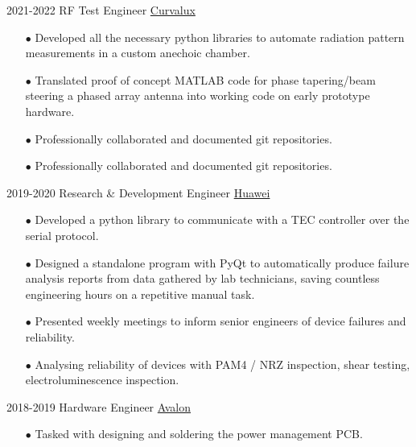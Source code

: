 \documentclass[9pt]{developercv} %
\begin{document}
\begin{entrylist}
	\entry
		{2021-2022}
		{RF Test Engineer}
		{\href{https://Curvalux.com}{Curvalux}}
		{	
			\begin{itemize}
				\item[$\bullet$\hspace*{0.5cm}] Developed all the necessary python libraries to automate radiation pattern measurements in a custom anechoic chamber.
				\item[$\bullet$\hspace*{0.5cm}] Translated proof of concept MATLAB code for phase tapering/beam steering a phased array antenna into working code on early prototype hardware.
				\item[$\bullet$\hspace*{0.5cm}] Professionally collaborated and documented git repositories.
				\item[$\bullet$\hspace*{0.5cm}] Professionally collaborated and documented git repositories.
			\end{itemize}
		}
	\entry
		{2019-2020}
		{Research \& Development Engineer}
		{\href{https://www.huawei.com/uk/contact-us}{Huawei}}
		{
			\begin{itemize}
				\item[$\bullet$\hspace*{0.5cm}] Developed a python library to communicate with a TEC controller over the serial protocol.
				\item[$\bullet$\hspace*{0.5cm}] Designed a standalone program with PyQt to automatically produce failure analysis reports from data gathered by lab technicians, saving countless engineering hours on a repetitive manual task.
				\item[$\bullet$\hspace*{0.5cm}] Presented weekly meetings to inform senior engineers of device failures and reliability.
				\item[$\bullet$\hspace*{0.5cm}] Analysing reliability of devices with PAM4 / NRZ inspection, shear testing, electroluminescence inspection.
			\end{itemize}
		}
		\entry
		{2018-2019}
		{Hardware Engineer}
		{\href{https://avalonrov.wixsite.com/avalonrov}{Avalon}}
		{
			\begin{itemize}
				\item[$\bullet$\hspace*{0.5cm}] Tasked with designing and soldering the power management PCB.

\end{itemize}}
\end{entrylist}
\end{document}
